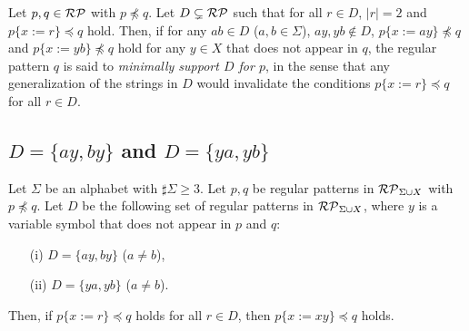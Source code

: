 \smallskip

\begin{dfn}
Let $p,q \in \mathcal{RP}$ {\color{red} with $p\not\preceq q$}.
Let $D \subsetneq \mathcal{RP}$ such that for all $r\in D$, $|r| = 2$ and $p \{ x := r \} \preceq q$ hold.
Then, if for any $ab\in D$ ($a,b\in\Sigma$), {\color{red} $ay,yb\not\in D$}, $p \{ x := ay \} \not\preceq q$ and $p \{ x := yb \} \not\preceq q$ hold for any $y \in X$ that does not appear in $q$,
{\color{red}the regular pattern $q$ is said to \textit{minimally support $D$ for $p$}, in the sense that any generalization of the strings in $D$ would invalidate the conditions $p\{x := r\} \preceq q$ for all $r\in D$}.

\end{dfn}



\subsection{$D=\{ ay, by \}$ and $D=\{ ya, yb \}$}\label{subsec:d2}

\begin{lem}\label{lem:twovariables}
Let $\Sigma$ be an alphabet with $\sharp\Sigma \ge 3$.
Let $p,q$ be regular patterns in {\color{red}$\mathcal{RP}_{\Sigma\cup X}$ with $p\not\preceq q$}.
Let $D$ be the following set of regular patterns in $\mathcal{RP}_{\Sigma\cup X}$, where $y$ is a variable symbol that does not appear in $p$ and $q$:
\begin{enumerate}
\item[{\rm (i)}] $D=\{ ay, by \}$ ($a \not= b$),
\item[{\rm (ii)}] $D=\{ ya, yb \}$ ($a \not= b$).
\end{enumerate}
Then, if $p \{ x := r \} \preceq q$ holds for all $r \in D$, then $p \{ x := xy \} \preceq q$ holds.
\end{lem}

